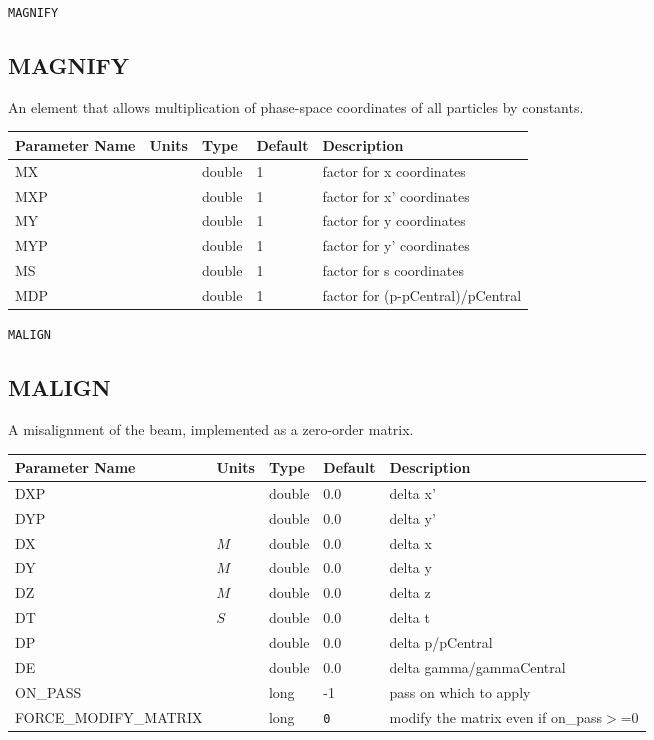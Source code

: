 \vspace*{0.5in}

\begin{latexonly}
\newpage
\begin{center}{\Large\verb|MAGNIFY|}\end{center}
\end{latexonly}\subsection{MAGNIFY}
An element that allows multiplication of phase-space coordinates of all particles
by constants.
\\
\begin{tabular}{|l|l|l|l|p{\descwidth}|} \hline
Parameter Name & Units & Type & Default & Description \\ \hline 
MX &  & double &   1 & factor for x coordinates  \\ \hline 
MXP &  & double &   1 & factor for x' coordinates  \\ \hline 
MY &  & double &   1 & factor for y coordinates  \\ \hline 
MYP &  & double &   1 & factor for y' coordinates  \\ \hline 
MS &  & double &   1 & factor for s coordinates  \\ \hline 
MDP &  & double &   1 & factor for (p-pCentral)/pCentral  \\ \hline 
\end{tabular}

\begin{latexonly}
\newpage
\begin{center}{\Large\verb|MALIGN|}\end{center}
\end{latexonly}\subsection{MALIGN}
A misalignment of the beam, implemented as a zero-order matrix.
\\
\begin{tabular}{|l|l|l|l|p{\descwidth}|} \hline
Parameter Name & Units & Type & Default & Description \\ \hline 
DXP &  & double &  0.0 & delta x'  \\ \hline 
DYP &  & double &  0.0 & delta y'  \\ \hline 
DX & $M$ & double &  0.0 & delta x  \\ \hline 
DY & $M$ & double &  0.0 & delta y  \\ \hline 
DZ & $M$ & double &  0.0 & delta z  \\ \hline 
DT & $S$ & double &  0.0 & delta t  \\ \hline 
DP &  & double &  0.0 & delta p/pCentral  \\ \hline 
DE &  & double &  0.0 & delta gamma/gammaCentral  \\ \hline 
ON\_PASS &  & long &   -1              & pass on which to apply  \\ \hline 
FORCE\_MODIFY\_MATRIX &  & long &  \verb|0| & modify the matrix even if on\_pass$>$=0  \\ \hline 
\end{tabular}

